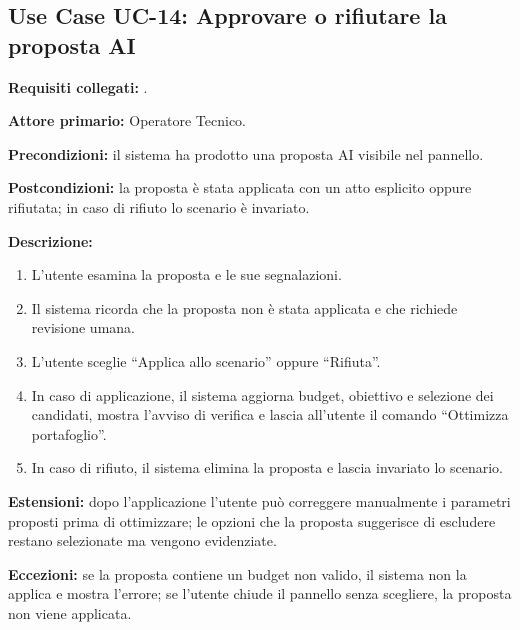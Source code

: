 \subsection*{Use Case UC-14: Approvare o rifiutare la proposta AI}
\textbf{Requisiti collegati:} .\par
\textbf{Attore primario:} Operatore Tecnico.\par
\textbf{Precondizioni:} il sistema ha prodotto una proposta AI visibile nel pannello.\par
\textbf{Postcondizioni:} la proposta è stata applicata con un atto esplicito oppure rifiutata; in caso di rifiuto lo scenario è invariato.\par
\textbf{Descrizione:}
\begin{enumerate}[leftmargin=1.6em, itemsep=0.1em]
    \item L'utente esamina la proposta e le sue segnalazioni.
    \item Il sistema ricorda che la proposta non è stata applicata e che richiede revisione umana.
    \item L'utente sceglie ``Applica allo scenario'' oppure ``Rifiuta''.
    \item In caso di applicazione, il sistema aggiorna budget, obiettivo e selezione dei candidati, mostra l'avviso di verifica e lascia all'utente il comando ``Ottimizza portafoglio''.
    \item In caso di rifiuto, il sistema elimina la proposta e lascia invariato lo scenario.
\end{enumerate}
\textbf{Estensioni:} dopo l'applicazione l'utente può correggere manualmente i parametri proposti prima di ottimizzare; le opzioni che la proposta suggerisce di escludere restano selezionate ma vengono evidenziate.\par
\textbf{Eccezioni:} se la proposta contiene un budget non valido, il sistema non la applica e mostra l'errore; se l'utente chiude il pannello senza scegliere, la proposta non viene applicata.

